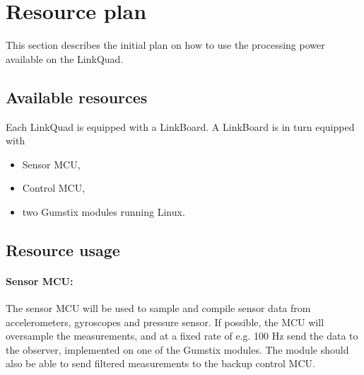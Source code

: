 \section{Resource plan}
\label{sec:resourceplan}
This section describes the initial plan on how to use the processing
power available on the LinkQuad.
    \subsection{Available resources}
        Each LinkQuad is equipped with a LinkBoard.
        A LinkBoard is in turn equipped with
        \begin{itemize}
            \item Sensor MCU,
            \item Control MCU,
            \item two Gumstix\textsuperscript{\textregistered} modules running Linux.
        \end{itemize}

    \subsection{Resource usage}
        \paragraph{Sensor MCU: } The sensor MCU will be used to sample
        and compile sensor data from accelerometers, gyroscopes and pressure sensor.
        If possible, the MCU will oversample the measurements, and at
        a fixed rate of e.g. 100 Hz send the data to the observer, implemented on
        one of the Gumstix\textsuperscript{\textregistered} modules.
        The module should also be able to send filtered measurements to the
        backup control MCU.
    


